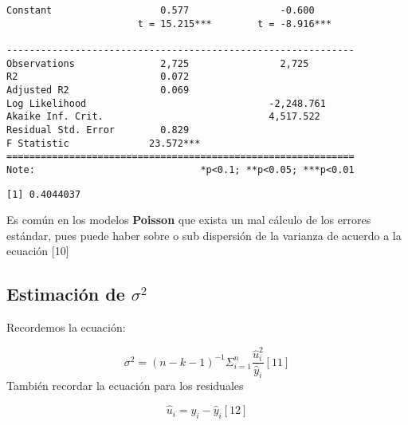 \documentclass[
  letterpaper,
  DIV=11,
  numbers=noendperiod]{scrreprt}
\newenvironment{Shaded}{\begin{snugshade}}{\end{snugshade}}
\newcommand{\DecValTok}[1]{\textcolor[rgb]{0.68,0.00,0.00}{#1}}
\newcommand{\FunctionTok}[1]{\textcolor[rgb]{0.28,0.35,0.67}{#1}}
\newcommand{\NormalTok}[1]{\textcolor[rgb]{0.00,0.23,0.31}{#1}}
\newcommand{\OtherTok}[1]{\textcolor[rgb]{0.00,0.23,0.31}{#1}}
\newcommand{\SpecialCharTok}[1]{\textcolor[rgb]{0.37,0.37,0.37}{#1}}
\newcommand{\StringTok}[1]{\textcolor[rgb]{0.13,0.47,0.30}{#1}}
\begin{document}
\begin{verbatim}
Constant                   0.577                -0.600       
                       t = 15.215***        t = -8.916***    
                                                             
-------------------------------------------------------------
Observations               2,725                2,725        
R2                         0.072                             
Adjusted R2                0.069                             
Log Likelihood                                -2,248.761     
Akaike Inf. Crit.                             4,517.522      
Residual Std. Error        0.829                             
F Statistic              23.572***                           
=============================================================
Note:                             *p<0.1; **p<0.05; ***p<0.01
\end{verbatim}

\begin{Shaded}
\end{Shaded}

\begin{verbatim}
[1] 0.4044037
\end{verbatim}

Es común en los modelos \textbf{Poisson} que exista un mal cálculo de
los errores estándar, pues puede haber sobre o sub dispersión de la
varianza de acuerdo a la ecuación {[}10{]}

\subsection{\texorpdfstring{Estimación de
\(\sigma^2\)}{Estimación de \textbackslash sigma\^{}2}}\label{estimaciuxf3n-de-sigma2}

Recordemos la ecuación:

\[\sigma^2=(n-k-1)^{-1}\Sigma_{i=1}^n\frac{\widehat{u}_i^2}{\widehat{y}_i} [11]\]
También recordar la ecuación para los residuales

\[\widehat{u}_i=y_i-\widehat{y}_i [12]\]

\begin{Shaded}
\end{Shaded}
\end{document}
